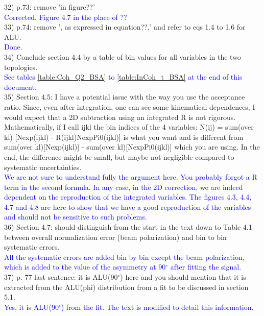 32) p.73: remove 'in figure??' \\
\textcolor{blue}{ Corrected. Figure 4.7 in the 
place of ??}\\

33) p.74: remove ', as expressed in equation??,' and refer to eqs 1.4 to 1.6 
for ALU.\\
\textcolor{blue}{ Done.}\\

34) Conclude section 4.4 by a table of bin values for all variables in the two 
topologies.\\
\textcolor{blue}{ See tables \ref{table:Coh_Q2_BSA} to \ref{table:InCoh_t_BSA} 
at the end of this document. }\\

35) Section 4.5: I have a potential issue with the way you use the acceptance 
ratio. Since, even after integration, one can see some kinematical dependences, 
I would expect that a 2D subtraction using an integrated R is not rigorous. 
Mathematically, if I call ijkl the bin indices of the 4 variables:
N(ij) = sum(over kl) [Nexp(ijkl) - R(ijkl)NexpPi0(ijkl)] is what you want and 
is different from sum(over kl)[Nexp(ijkl)] -  sum(over kl)[NexpPi0(ijkl)] which 
you are using. In the end, the difference might be small, but maybe not 
negligible compared to systematic uncertainties.\\
\textcolor{blue}{We are not sure to understand fully the argument here. You 
   probably forgot a R term in the second formula. In any case, in the 2D 
   correction, we are indeed dependent on the reproduction of the integrated 
   variables. The figures 4.3, 4.4, 4.7 and 4.8 are here to show that we have a 
   good reproduction of the variables and should not be sensitive to such 
   problems. }\\


36) Section 4.7: should distinguish from the start in the text down to Table 
4.1 between overall normalization error (beam polarization) and bin to bin 
systematic errors. \\
\textcolor{blue}{All the systematic errors are added bin by bin except the beam 
polarization, which is added to the value of the asymmetry at 90$^{\circ}$ after 
fitting the signal.}\\


37) p. 77 last sentence: it is ALU(90$^{\circ}$) here and you should mention that it is 
extracted from the ALU(phi) distribution from a fit to be discussed in section 
5.1.\\
\textcolor{blue}{Yes, it is ALU(90$^{\circ}$) from the fit. The text is modified to 
detail this information.}\\



